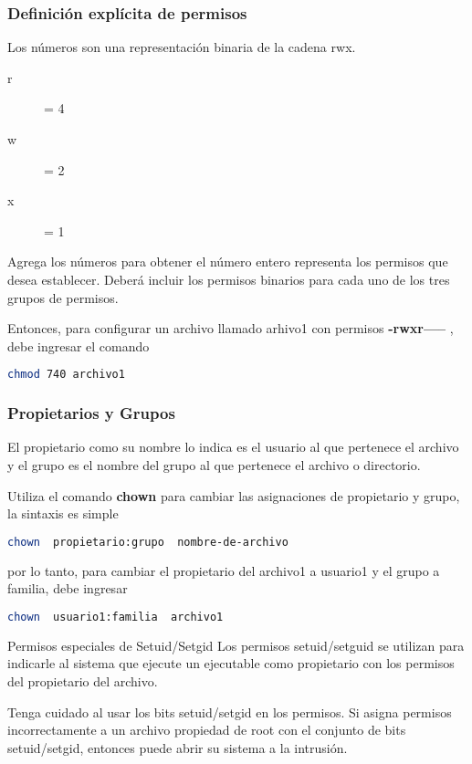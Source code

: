 \begin{frame}[fragile]
  \frametitle{Definición explícita de permisos}
  Los números son una representación binaria de la cadena rwx.
  \begin{description}
    \item [r] = 4
    \item [w] = 2
    \item [x] = 1
  \end{description}

  \vspace{\baselineskip}
  Agrega los números para obtener el número entero representa los
  permisos que desea establecer. Deberá incluir los permisos binarios para
  cada uno de los tres grupos de permisos.

  Entonces, para configurar un archivo llamado arhivo1 con permisos
  \textbf{-rwxr-----} , debe ingresar el comando
  \begin{lstlisting}[language=Bash]
chmod 740 archivo1
  \end{lstlisting}
\end{frame}

\begin{frame}[fragile]
  \frametitle{Propietarios y Grupos}
  El propietario como su nombre lo indica es el usuario al que pertenece el
  archivo y el grupo es el nombre del grupo al que pertenece el archivo o
  directorio.

  Utiliza el comando \textbf{chown} para cambiar las asignaciones de
  propietario y grupo, la sintaxis es simple
  \begin{lstlisting}[language=Bash]
chown  propietario:grupo  nombre-de-archivo
  \end{lstlisting}
  por lo tanto, para cambiar el propietario del archivo1 a usuario1 y el grupo
  a familia, debe ingresar
  \begin{lstlisting}[language=Bash]
chown  usuario1:familia  archivo1
  \end{lstlisting}
\end{frame}

\begin{frame}[c]{Permisos especiales de Setuid/Setgid}
  Los permisos setuid/setguid se utilizan para indicarle al sistema que
  ejecute un ejecutable como propietario con los permisos del propietario
  del archivo.

  \vspace{\baselineskip}
  Tenga cuidado al usar los bits setuid/setgid en los permisos. Si asigna
  permisos incorrectamente a un archivo propiedad de root con el conjunto
  de bits setuid/setgid, entonces puede abrir su sistema a la intrusión.
\end{frame}

